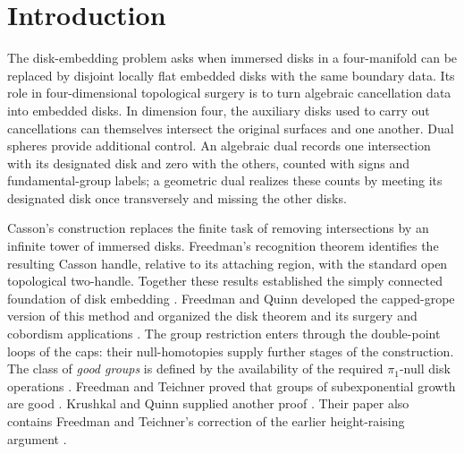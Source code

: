 \begin{abstract}
We disprove the unrestricted four-dimensional disk-embedding conjecture.
We construct immersed disks in a compact oriented smooth four-manifold with
framed algebraic dual spheres satisfying the usual equivariant intersection
and reduced self-intersection conditions, but with no pairwise disjoint locally
flat replacements that preserve the boundary maps and induced normal framings.
The obstruction holds even when the replacement disks' relative homotopy classes
are not prescribed.
\end{abstract}

\section{Introduction}\label{sec:introduction}

The disk-embedding problem asks when immersed disks in a four-manifold can
be replaced by disjoint locally flat embedded disks with the same boundary
data. Its role in four-dimensional topological surgery is to turn
algebraic cancellation data into embedded disks.
In dimension four, the auxiliary disks used to carry out cancellations
can themselves intersect the original surfaces and one another.
Dual spheres provide additional control. An algebraic dual records one
intersection with its designated disk and zero with the others, counted
with signs and fundamental-group labels; a geometric dual realizes these
counts by meeting its designated disk once transversely and missing the
other disks.

Casson's construction replaces the finite task of removing intersections
by an infinite tower of immersed disks. Freedman's recognition theorem
identifies the resulting Casson handle, relative to its attaching region,
with the standard open topological two-handle. Together these results
established the simply connected foundation of disk embedding
\cite[Introduction and Theorem~1.1]{Freedman1982}.
Freedman and Quinn developed the capped-grope version of this method and
organized the disk theorem and its surgery and cobordism applications
\cite[Theorem~5.1A and Chapter~11]{FQ1990}.
The group restriction enters through the double-point loops of the caps:
their null-homotopies supply further stages of the construction.
The class of \emph{good groups} is defined by the availability of the
required \(\pi_1\)-null disk operations
\cite[Definition~3.2]{PRT2025}.
Freedman and Teichner proved that groups of subexponential growth are good
\cite[Theorem~0.1]{FT1995}. Krushkal and Quinn supplied another proof
\cite[Theorem, p.~408]{KQ2000}. Their paper also contains
Freedman and Teichner's correction of the earlier height-raising
argument \cite[Appendix, pp.~424--430]{KQ2000}.

